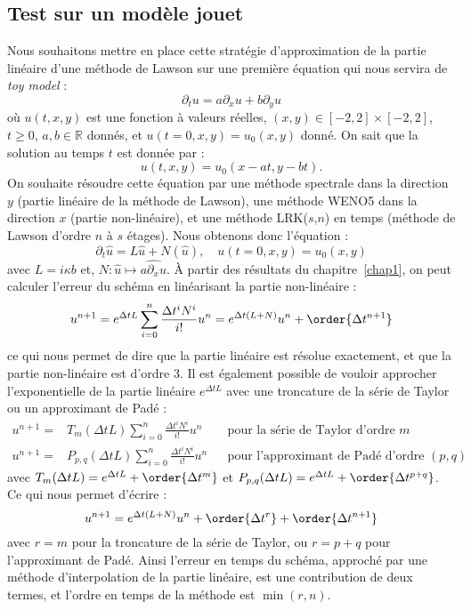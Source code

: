 \subsection{Test sur un modèle jouet}

Nous souhaitons mettre en place cette stratégie d'approximation de la partie linéaire d'une méthode de Lawson sur une première équation qui nous servira de \emph{toy model} :
$$
  \partial_t u = a\partial_x u + b\partial_y u
$$
où $u(t,x,y)$ est une fonction à valeurs réelles, $(x,y)\in[-2,2]\times[-2,2]$, $t\geq0$, $a,b\in\mathbb{R}$ donnés, et $u(t=0,x,y)=u_0(x,y)$ donné. On sait que la solution au temps $t$ est donnée par :
$$
  u(t,x,y) = u_0(x-at,y-bt).
$$
On souhaite résoudre cette équation par une méthode spectrale dans la direction $y$ (partie linéaire de la méthode de Lawson), une méthode WENO5 dans la direction $x$ (partie non-linéaire), et une méthode LRK($s$,$n$) en temps (méthode de Lawson d'ordre $n$ à $s$ étages). Nous obtenons donc l'équation :
$$
  \partial_t \hat{u} = L\hat{u} + N(\hat{u}),\quad u(t=0,x,y) = u_0(x,y)
$$
avec $L = i\kappa b$ et, $N:\hat{u}\mapsto\widehat{a\partial_xu}$. À partir des résultats du chapitre~\ref{chap1}, on peut calculer l'erreur du schéma en linéarisant la partie non-linéaire :
$$
  u^{n+1} = e^{\Delta tL}\sum_{i=0}^{n}\frac{\Delta t^iN^i}{i!}u^n = e^{\Delta t (L+N)}u^n + \order{\Delta t^{n+1}}
$$
ce qui nous permet de dire que la partie linéaire est résolue exactement, et que la partie non-linéaire est d'ordre 3. Il est également possible de vouloir approcher l'exponentielle de la partie linéaire $e^{\Delta tL}$ avec une troncature de la série de Taylor ou un approximant de Padé :
$$
  \begin{aligned}
    u^{n+1} =& T_m(\Delta tL)\sum_{i=0}^{n}\frac{\Delta t^iN^i}{i!}u^n     & & \text{pour la série de Taylor d'ordre $m$} \\
    u^{n+1} =& P_{p,q}(\Delta tL)\sum_{i=0}^{n}\frac{\Delta t^iN^i}{i!}u^n & & \text{pour l'approximant de Padé d'ordre $(p,q)$}
  \end{aligned}
$$
avec $T_m(\Delta tL) = e^{\Delta tL}+\order{\Delta t^m}$ et $P_{p,q}(\Delta tL) = e^{\Delta tL}+\order{\Delta t^{p+q}}$. Ce qui nous permet d'écrire :
$$
  u^{n+1} = e^{\Delta t (L+N)}u^n + \order{\Delta t^r} + \order{\Delta t^{n+1}}
$$
avec $r=m$ pour la troncature de la série de Taylor, ou $r=p+q$ pour l'approximant de Padé. Ainsi l'erreur en temps du schéma, approché par une méthode d'interpolation de la partie linéaire, est une contribution de deux termes, et l'ordre en temps de la méthode est $\min(r,n)$.

